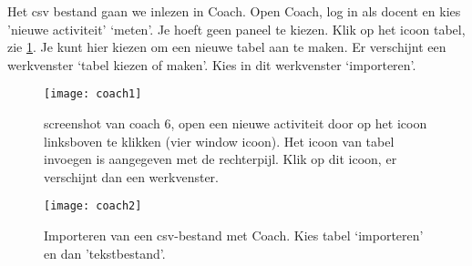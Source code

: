 Het csv bestand gaan we inlezen in Coach. Open Coach, log in als docent en kies 'nieuwe activiteit' 
`meten'. Je hoeft geen paneel te kiezen.
Klik op het icoon tabel, zie \ref{fig:coach1}. Je kunt hier kiezen om een
nieuwe tabel aan te maken. Er verschijnt een werkvenster `tabel kiezen of maken'.
Kies in dit werkvenster `importeren'.


\begin{figure}
    \centering
    \texttt{[image: coach1]}
    \caption{screenshot van coach 6, open een nieuwe activiteit door op 
    het icoon linksboven te klikken (vier window icoon). Het icoon van tabel invoegen is
    aangegeven met de rechterpijl. Klik op dit icoon, er verschijnt dan een werkvenster.}
    \label{fig:coach1}
\end{figure}

\begin{figure}
    \centering
    \texttt{[image: coach2]}
    \caption{Importeren van een csv-bestand met Coach. Kies tabel `importeren' en
    dan 'tekstbestand'.}
    \label{fig:coach2}
\end{figure}
   

